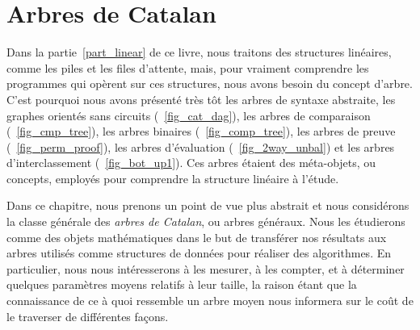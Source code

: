 \chapter{Arbres de Catalan}
\label{chap_Catalan}

Dans la partie~\ref{part_linear} de ce livre, nous traitons des
structures linéaires, comme les piles et les files d'attente, mais,
pour vraiment comprendre les programmes qui opèrent sur ces
structures, nous avons besoin du concept d'arbre. C'est pourquoi nous
avons présenté très tôt les arbres de syntaxe
abstraite, les graphes
orientés sans circuits (\fig~\vref{fig_cat_dag}), les arbres de
comparaison (\fig~\vref{fig_cmp_tree}), les arbres binaires
(\fig~\vref{fig_comp_tree}), les arbres de preuve
(\fig~\vref{fig_perm_proof}), les arbres d'évaluation
(\fig~\vref{fig_2way_unbal}) et les arbres d'interclassement
(\fig~\vref{fig_bot_up1}). Ces arbres étaient des méta-objets, ou
concepts, employés pour comprendre la structure linéaire à l'étude.

Dans ce chapitre, nous prenons un point de vue plus abstrait et nous
considérons la classe générale des \emph{arbres de Catalan}, ou arbres
généraux. Nous les étudierons comme des objets mathématiques dans le
but de transférer nos résultats aux arbres utilisés comme structures
de données pour réaliser des algorithmes. En particulier, nous nous
intéresserons à les mesurer, à les compter, et à déterminer quelques
paramètres moyens relatifs à leur taille, la raison étant que la
connaissance de ce à quoi ressemble un arbre moyen nous informera sur
le coût de le traverser de différentes façons.

